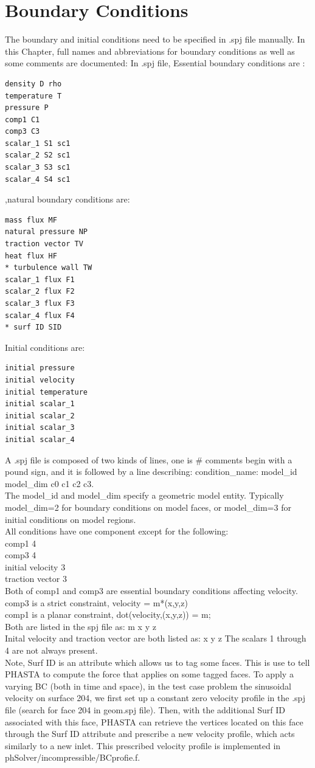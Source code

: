 \documentclass{article}
\begin{document}
\section{Boundary Conditions}
\label{ch:4}
The boundary and initial conditions need to be specified in .spj file manually. In this Chapter, full names and abbreviations for boundary conditions as well as some comments are documented:
In .spj file, Essential boundary conditions are :
\begin{lstlisting}
density D rho
temperature T
pressure P
comp1 C1
comp3 C3
scalar_1 S1 sc1
scalar_2 S2 sc1
scalar_3 S3 sc1
scalar_4 S4 sc1
\end{lstlisting}
,natural boundary conditions are:
\begin{lstlisting}
mass flux MF
natural pressure NP
traction vector TV
heat flux HF
* turbulence wall TW
scalar_1 flux F1
scalar_2 flux F2
scalar_3 flux F3
scalar_4 flux F4
* surf ID SID
\end{lstlisting}
Initial conditions are:
\begin{lstlisting}
initial pressure
initial velocity
initial temperature
initial scalar_1
initial scalar_2
initial scalar_3
initial scalar_4
\end{lstlisting}
A .spj file is composed of two kinds of lines, one is \# comments begin with a pound sign, and it is followed by a line describing: condition\_name: model\_id model\_dim c0 c1 c2 c3. \\
The model\_id and model\_dim specify a geometric model entity. Typically model\_dim=2 for boundary conditions on model faces, or model\_dim=3 for initial conditions on model regions.\\
All conditions have one component except for the following:\\
comp1 4 \\
comp3 4 \\
initial velocity 3 \\
traction vector 3 \\
Both of comp1 and comp3 are essential boundary conditions affecting velocity. \\
comp3 is a strict constraint, velocity = m*(x,y,z) \\
comp1 is a planar constraint, dot(velocity,(x,y,z)) = m; \\
Both are listed in the spj file as: m x y z \\
Inital velocity and traction vector are both listed as: x y z
The scalars 1 through 4 are not always present. \\
Note, Surf ID is an attribute which allows us to tag some faces. This is use to tell PHASTA to compute the force that applies on some tagged faces.
To apply a varying BC (both in time and space), in the test case problem the sinusoidal velocity on surface 204, we first set up a constant zero velocity profile in the .spj file (search for face 204 in geom.spj file). Then, with the additional Surf ID associated with this face, PHASTA can retrieve the vertices located on this face through the Surf ID attribute and prescribe a new velocity profile, which acts similarly to a new inlet. This prescribed velocity profile is implemented in phSolver/incompressible/BCprofie.f.
\end{document}
